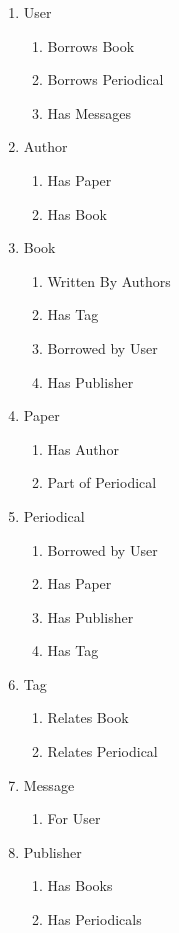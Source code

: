 \documentclass[12pt]{article}
\begin{document}
\begin{enumerate}
\item User
\begin{enumerate}
\item Borrows Book
\item Borrows Periodical
\item Has Messages
\end{enumerate}
\item Author
\begin{enumerate}
\item Has Paper
\item Has Book
\end{enumerate}
\item Book
\begin{enumerate}
\item Written By Authors
\item Has Tag
\item Borrowed by User
\item Has Publisher
\end{enumerate}
\item Paper
\begin{enumerate}
\item Has Author
\item Part of Periodical
\end{enumerate}
\item Periodical
\begin{enumerate}
\item Borrowed by User
\item Has Paper
\item Has Publisher
\item Has Tag
\end{enumerate}
\item Tag
\begin{enumerate}
\item Relates Book
\item Relates Periodical
\end{enumerate}
\item Message
\begin{enumerate}
\item For User
\end{enumerate}
\item Publisher
\begin{enumerate}
\item Has Books
\item Has Periodicals
\end{enumerate}
\end{enumerate}
\end{document}
